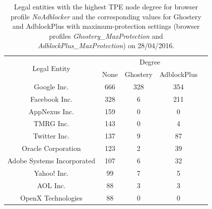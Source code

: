 \begin{table}
  \centering
  \begin{tabular}{|c|c|c|c|c|}
  \hline
  \multirow{2}{*}{Legal Entity} & \multicolumn{3}{|c|}{Degree} \\
  \cline{2-4}
    & \scriptsize{None} & \scriptsize{Ghostery} & \scriptsize{AdblockPlus} \\
  \hline
  Google Inc. & 666 & 328 & 354 \\
  Facebook Inc. & 328 & 6 & 211 \\
  AppNexus Inc. & 159 & 0 & 0 \\
  TMRG Inc. & 143 & 0 & 4 \\
  Twitter Inc. & 137 & 9 & 87 \\
  Oracle Corporation & 123 & 2 & 39 \\
  Adobe Systems Incorporated & 107 & 6 & 32 \\
  Yahoo! Inc. & 99 & 7 & 5 \\
  AOL Inc. & 88 & 3 & 3 \\
  OpenX Technologies & 88 & 0 & 0 \\
  \hline
  \end{tabular}
  \caption{Legal entities with the highest TPE node degree for browser profile \textit{NoAdblocker} and the corresponding values for Ghostery and AdblockPlus with maximum-protection settings (browser profiles \textit{Ghostery\_MaxProtection} and \textit{AdblockPlus\_MaxProtection}) on 28/04/2016.}
  \label{table:top_10_tpd_entities}
  \end{table}
  
